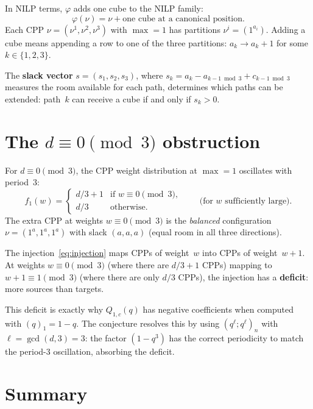 \documentclass[11pt]{article}
\theoremstyle{plain}
\theoremstyle{definition}
\begin{document}
In NILP terms, $\varphi$ adds one cube to the NILP family:
\[
  \varphi(\nu) = \nu + \text{one cube at a canonical position}.
\]
Each CPP $\nu = (\nu^1, \nu^2, \nu^3)$ with $\max = 1$ has
partitions $\nu^i = (1^{a_i})$.  Adding a cube means appending
a row to one of the three partitions: $a_k \to a_k + 1$ for some
$k \in \{1, 2, 3\}$.

The \textbf{slack vector} $s = (s_1, s_2, s_3)$, where
$s_k = a_k - a_{k-1 \bmod 3} + c_{k-1 \bmod 3}$ measures the room
available for each path, determines which paths can be extended:
path~$k$ can receive a cube if and only if $s_k > 0$.


\section{The $d \equiv 0 \pmod{3}$ obstruction}
\label{sec:d0}

For $d \equiv 0 \pmod{3}$, the CPP weight distribution at $\max = 1$
oscillates with period~$3$:
\[
  f_1(w) =
  \begin{cases}
    d/3 + 1 & \text{if } w \equiv 0 \pmod{3}, \\
    d/3     & \text{otherwise}.
  \end{cases}
  \qquad\text{(for $w$ sufficiently large).}
\]
The extra CPP at weights $w \equiv 0 \pmod{3}$ is the
\emph{balanced} configuration $\nu = (1^{a}, 1^{a}, 1^{a})$ with
slack $(a, a, a)$ (equal room in all three directions).

The injection~\eqref{eq:injection} maps CPPs of weight~$w$ into CPPs
of weight~$w+1$.  At weights $w \equiv 0 \pmod{3}$ (where there are
$d/3 + 1$ CPPs) mapping to $w+1 \equiv 1 \pmod{3}$ (where there are
only $d/3$ CPPs), the injection has a \textbf{deficit}: more sources
than targets.

This deficit is exactly why $Q_{1,c}(q)$ has negative coefficients
when computed with $(q)_1 = 1 - q$.  The conjecture resolves this by
using $(q^\ell; q^\ell)_n$ with $\ell = \gcd(d, 3) = 3$: the factor
$(1 - q^3)$ has the correct periodicity to match the period-$3$
oscillation, absorbing the deficit.


\section{Summary}
\label{sec:summary}
\end{document}
